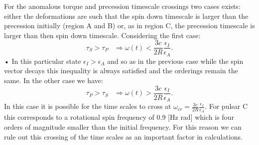 For the anomalous torque and precession timescale crossings two cases exists:
either the deformations are such that the spin down timescale is larger than
the precession initially (region A and B) or, as in region C, the precession
timescale is larger than then spin down timescale. Considering the first case:
\begin{equation}
\tau_{S}>\tau_{P} \;\;\; 
\Rightarrow \omega(t)<\frac{3c}{2R}\frac{\epsilon_{I}}{\epsilon_{A}}.
\end{equation}•
In this particular state $\epsilon_{I}>\epsilon_{A}$ and so as in the previous
case while the spin vector decays this inequality is always satisfied and the
orderings remain the same. In the other case we have:
\begin{equation}
\tau_{P}>\tau_{S} \;\;\; 
\Rightarrow \omega(t)>\frac{3c}{2R}\frac{\epsilon_{I}}{\epsilon_{A}}.
\end{equation}
In this case it is possible for the time scales to cross at
$\omega_{cr}=\frac{3c}{2R}\frac{\epsilon_{I}}{\epsilon_{A}}$. For pulsar C this
corresponds to a rotational spin frequency of $0.9$ [Hz rad] which is four
orders of magnitude smaller than the initial frequency. For this reason we can
rule out this crossing of the time scales as an important factor in
calculations. 



